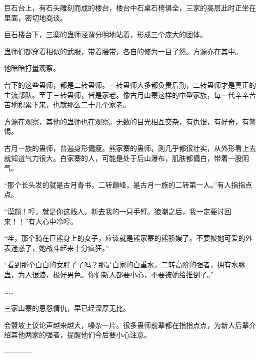 \begin{this_body}
巨石台上，有石头雕刻而成的楼台，楼台中石桌石椅俱全，三家的高层此时正坐在里面，密切地商谈。

巨石楼台下，三寨的蛊师泾渭分明地站着，形成三个庞大的团体。

蛊师们都穿着相似的武服，带着腰带，各自的修为一目了然。方源亦在其中。

他暗暗打量观察。

台下的这些蛊师，都是二转蛊师。一转蛊师大多都负责后勤，二转蛊师才是真正的主流部队。至于三转蛊师，皆是家老。像古月山寨这样的中型家族，每一代辛辛苦苦地积累下来，也就那么二十几个家老。

方源在观察，其他的蛊师也在观察。无数的目光相互交杂，有仇恨，有好奇，有警惕。

古月一族的蛊师，普遍身形偏瘦。熊家寨的蛊师，则几乎都很壮实，从外形看上去就知道气力很大。白家寨的人，可能是处于后山瀑布，肌肤都偏白，带着一股阴气。

“那个长头发的就是古月青书，二转巅峰，是古月一族的二转第一人。”有人指指点点。

“漠颜！哼，就是你这贱人，断去我的一只手臂。狼潮之后，我一定要讨回来！！”有人心中冷哼。

“哇，那个骑在巨熊身上的女子，应该就是熊家寨的熊骄嫚了。不要被她可爱的外表迷惑了，她战斗起来十分疯狂。”

“看到那个白白的女胖子了吗？那是白家的白重水，二转高阶的强者，拥有水豚蛊，为人很浪，极好男色。你们新人都要小心，不要被她给推倒了。”

……

三家山寨的恩怨情仇，早已经深厚无比。

会盟坡上议论声越来越大，噪杂一片。很多蛊师前辈都在指指点点，为新人后辈介绍其他两家的强者，提醒他们今后要小心注意。

------------

\end{this_body}

